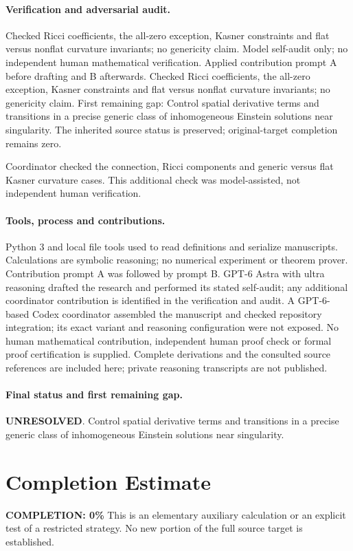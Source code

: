\documentclass[11pt]{article}
\begin{document}
\paragraph{Verification and adversarial audit.}
Checked Ricci coefficients, the all-zero exception, Kasner constraints and flat versus nonflat curvature invariants; no genericity claim. Model self-audit only; no independent human mathematical verification. Applied contribution prompt A before drafting and B afterwards. Checked Ricci coefficients, the all-zero exception, Kasner constraints and flat versus nonflat curvature invariants; no genericity claim. First remaining gap: Control spatial derivative terms and transitions in a precise generic class of inhomogeneous Einstein solutions near singularity. The inherited source status is preserved; original-target completion remains zero.

Coordinator checked the connection, Ricci components and generic versus flat Kasner curvature cases. This additional check was model-assisted, not independent human verification.

\paragraph{Tools, process and contributions.}
Python 3 and local file tools used to read definitions and serialize manuscripts. Calculations are symbolic reasoning; no numerical experiment or theorem prover. Contribution prompt A was followed by prompt B. GPT-6 Astra with ultra reasoning drafted the research and performed its stated self-audit; any additional coordinator contribution is identified in the verification and audit. A GPT-6-based Codex coordinator assembled the manuscript and checked repository integration; its exact variant and reasoning configuration were not exposed. No human mathematical contribution, independent human proof check or formal proof certification is supplied. Complete derivations and the consulted source references are included here; private reasoning transcripts are not published.

\paragraph{Final status and first remaining gap.}
\textbf{UNRESOLVED}. Control spatial derivative terms and transitions in a precise generic class of inhomogeneous Einstein solutions near singularity.

\section{Completion Estimate}
\noindent\textbf{COMPLETION: 0\%}
This is an elementary auxiliary calculation or an explicit test of a restricted strategy. No new portion of the full source target is established.
\end{document}
